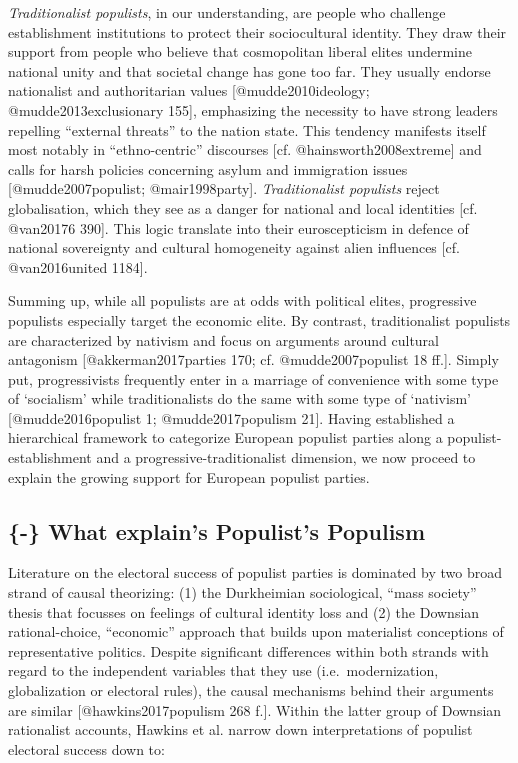 \documentclass[]{article}
\begin{document}
\emph{Traditionalist populists}, in our understanding, are people who
challenge establishment institutions to protect their sociocultural
identity. They draw their support from people who believe that
cosmopolitan liberal elites undermine national unity and that societal
change has gone too far. They usually endorse nationalist and
authoritarian values {[}@mudde2010ideology; @mudde2013exclusionary
155{]}, emphasizing the necessity to have strong leaders repelling
``external threats'' to the nation state. This tendency manifests itself
most notably in ``ethno-centric'' discourses {[}cf.
@hainsworth2008extreme{]} and calls for harsh policies concerning asylum
and immigration issues {[}@mudde2007populist; @mair1998party{]}.
\emph{Traditionalist populists} reject globalisation, which they see as
a danger for national and local identities {[}cf. @van20176 390{]}. This
logic translate into their euroscepticism in defence of national
sovereignty and cultural homogeneity against alien influences {[}cf.
@van2016united 1184{]}.

Summing up, while all populists are at odds with political elites,
progressive populists especially target the economic elite. By contrast,
traditionalist populists are characterized by nativism and focus on
arguments around cultural antagonism {[}@akkerman2017parties 170; cf.
@mudde2007populist 18 ff.{]}. Simply put, progressivists frequently
enter in a marriage of convenience with some type of `socialism' while
traditionalists do the same with some type of `nativism'
{[}@mudde2016populist 1; @mudde2017populism 21{]}. Having established a
hierarchical framework to categorize European populist parties along a
populist-establishment and a progressive-traditionalist dimension, we
now proceed to explain the growing support for European populist
parties.

\subsection{\{-\} What explain's Populist's
Populism}\label{what-explains-populists-populism}

Literature on the electoral success of populist parties is dominated by
two broad strand of causal theorizing: (1) the Durkheimian sociological,
``mass society'' thesis that focusses on feelings of cultural identity
loss and (2) the Downsian rational-choice, ``economic'' approach that
builds upon materialist conceptions of representative politics. Despite
significant differences within both strands with regard to the
independent variables that they use (i.e.~modernization, globalization
or electoral rules), the causal mechanisms behind their arguments are
similar {[}@hawkins2017populism 268 f.{]}. Within the latter group of
Downsian rationalist accounts, Hawkins et al. narrow down
interpretations of populist electoral success down to:
\end{document}
